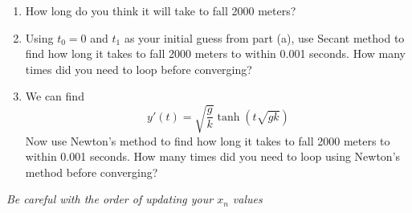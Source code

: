 \documentclass[11pt]{article}
\begin{document}
	
	\begin{enumerate}[label=\alph*)]
		\item How long do you think it will take to fall 2000 meters?
		\item Using $t_0=0$ and $t_1$ as your initial guess from part (a), use Secant method to find how long it takes to fall 2000 meters to within 0.001 seconds. How many times did you need to loop before converging?
		\item We can find 
		\begin{equation*}
			y'(t) = \sqrt{\frac{g}{k}}\tanh(t\sqrt{gk})
		\end{equation*}
		Now use Newton's method to find how long it takes to fall 2000 meters to within 0.001 seconds. How many times did you need to loop using Newton's method before converging?
	\end{enumerate}

	\begin{center}
		\vfill
		\textit{Be careful with the order of updating your $x_n$ values}
	\end{center}
\end{document}
